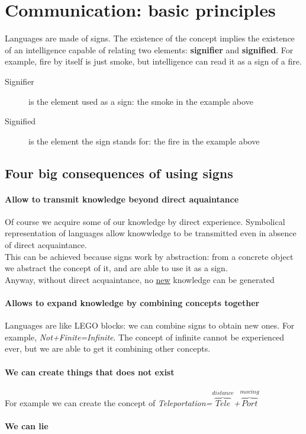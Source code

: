 \documentclass{article}
\begin{document}
\section{Communication: basic principles}
Languages are made of signs. The existence of the concept implies the existence of an intelligence capable of relating two elements: \textbf{signifier} and \textbf{signified}. For example, fire by itself is just smoke, but intelligence can read it as a sign of a fire.
\begin{description}
\item[Signifier] is the element used as a sign: the smoke in the example above
\item[Signified] is the element the sign stands for: the fire in the example above
\end{description}


\subsection{Four big consequences of using signs}
\paragraph{Allow to transmit knowledge beyond direct aquaintance} Of course we acquire some of our knowledge by direct experience. Symbolical representation of languages allow knowwledge to be transmitted even in absence of direct acquaintance.\\ 
This can be achieved because signs work by abstraction: from a concrete object we abstract the concept of it, and are able to use it as a sign.\\
Anyway, without direct acquaintance, no \underline{new} knowledge can be generated
\paragraph{Allows to expand knowledge by  combining concepts together} Languages are like LEGO blocks: we can combine signs to obtain new ones. For example, \textit{Not+Finite=Infinite}. The concept of infinite cannot be experienced ever, but we are able to get it combining other concepts.
\paragraph{We can create things that does not exist} For example we can create the concept of \textit{Teleportation=$\overbrace{Tele}^{distance}$+$\overbrace{Port}^{moving}$}
\paragraph{We can lie}
\end{document}
